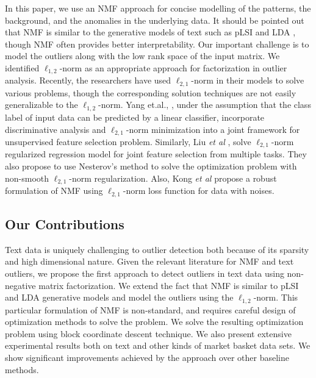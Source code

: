 In this paper, we use an NMF approach for concise modelling of the
patterns, the background, and the anomalies in the underlying data.
It should be pointed out that NMF is similar to the generative
models of text such as pLSI and LDA \cite{Gaussier2005}
\cite{Ding2006} \cite{Singh2008}, though NMF often provides better
interpretability. Our important challenge is to model the outliers
along with the low rank space of the input matrix. We identified
$\ell_{1,2}$-norm as an appropriate approach for factorization in
outlier analysis. Recently, the researchers have used  $\ell_{2,1}$-norm in their models to solve various problems, though the
corresponding solution techniques are not easily generalizable to
the $\ell_{1,2}$-norm. Yang et.al., \cite{Yang2011}, under the
assumption that the class label of input data can be predicted by a
linear classifier, incorporate discriminative analysis and
$\ell_{2,1}$-norm minimization into a joint framework for
unsupervised feature selection problem. Similarly, Liu {\em et al}
\cite{Liu2009}, solve $\ell_{2,1}$-norm regularized regression model
for joint feature selection from multiple tasks. They also propose
to use Nesterov's method to solve the optimization problem with
non-smooth $\ell_{2,1}$-norm regularization. Also, Kong {\em et al}
\cite{Kong2011} propose a robust formulation of NMF using
$\ell_{2,1}$-norm loss function for data with noises.
\subsection{Our Contributions}
Text data is uniquely challenging to outlier detection both because
of its sparsity and high dimensional nature.  Given the relevant
literature for NMF and text outliers, we propose the first approach
to detect outliers in text data using non-negative matrix
factorization. We extend the fact that NMF is similar to pLSI and
LDA generative models and model the outliers using the
$\ell_{1,2}$-norm.  This particular formulation of NMF is
non-standard, and requires careful design of optimization methods to
solve the problem. We solve the resulting optimization problem using
block coordinate descent technique. We also present extensive
experimental results both on text and other kinds of market basket
data sets. We show significant improvements achieved by the approach
over other baseline methods.
